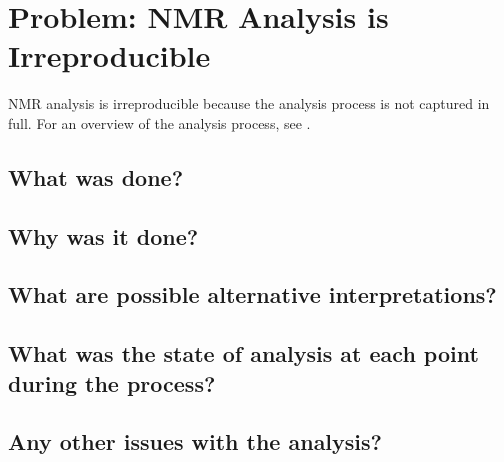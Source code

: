 \chapter{Problem: NMR Analysis is Irreproducible}

NMR analysis is irreproducible because the analysis process is not captured
in full.  For an overview of the analysis process, see \cite{guerry2011automated,
guntert2009automated, williamson2009automated}.

\section{What was done?}

\section{Why was it done?}

\section{What are possible alternative interpretations?}

\section{What was the state of analysis at each point during the process?}

\section{Any other issues with the analysis?}

